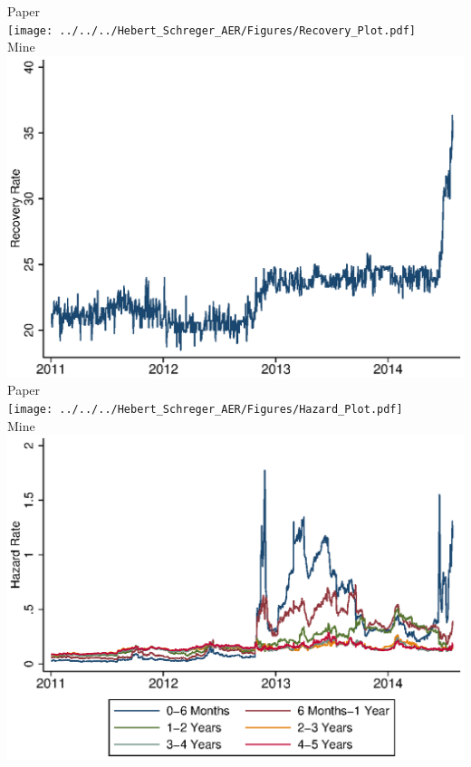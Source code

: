\documentclass{article}
\begin{document}
\newpage Paper \\
\texttt{[image: ../../../Hebert\_Schreger\_AER/Figures/Recovery\_Plot.pdf]}\\
Mine \\
\includegraphics[scale = .8]{Recovery_Plot.eps}\\

\newpage Paper \\
\texttt{[image: ../../../Hebert\_Schreger\_AER/Figures/Hazard\_Plot.pdf]}\\
Mine \\
\includegraphics[scale = .8]{Hazard_Plot.eps}\\
\end{document}
